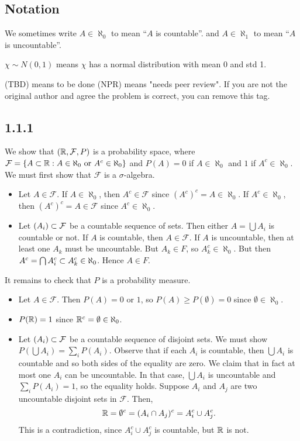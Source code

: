 \documentclass[11pt]{article}
\begin{document}
\subsection*{Notation}

We sometimes write $A \in \aleph_0$ to mean ``$A$ is countable''. and $A \in \aleph_1$ to mean ``$A$ is uncountable''. 

$\chi \sim N(0,1)$ means $\chi$ has a normal distribution with mean 0 and std 1.

(TBD) means to be done
(NPR) means "needs peer review". If you are not the original author and agree the problem is correct, you can remove this tag.

\subsection*{1.1.1}

We show that $({\mathbb R}, \mathcal{F}, P)$ is a probability space, where $\mathcal{F} = \{A \subset {\mathbb R} : A \in \aleph_0 \text{ or } A^c \in \aleph_0\}$ and $P(A) = 0$ if $A \in \aleph_0$ and $1$ if $A^c \in \aleph_0$. We must first show that $\mathcal{F}$ is a $\sigma$-algebra. 

\begin{itemize}
    \item Let $A \in \mathcal{F}$. If $A \in \aleph_0$, then $A^c \in \mathcal{F}$ since $(A^c)^c = A \in \aleph_0$. If $A^c \in \aleph_0$, then $(A^c)^c = A \in \mathcal{F}$ since $A^c \in \aleph_0$.
    \item Let $(A_i) \subset \mathcal{F}$ be a countable sequence of sets. Then either $A = \bigcup A_i$ is countable or not. If $A$ is countable, then $A \in \mathcal{F}$. If $A$ is uncountable, then at least one $A_k$ must be uncountable. But $A_k \in F$, so $A_k^c \in \aleph_0$. But then $A^c = \bigcap A_i^c \subset A_k^c \in \aleph_0$. Hence $A \in F$.
\end{itemize} 

It remains to check that $P$ is a probability measure. 

\begin{itemize}
    \item Let $A \in \mathcal{F}$. Then $P(A) = 0$ or $1$, so $P(A) \geq P(\emptyset) = 0$ since $\emptyset \in \aleph_0$.
    \item $P({\mathbb R}) = 1$ since ${\mathbb R}^c = \emptyset \in \aleph_0$.
    \item Let $(A_i) \subset \mathcal{F}$ be a countable sequence of disjoint sets. We must show $P(\bigcup A_i) = \sum_i P(A_i)$. Observe that if each $A_i$ is countable, then $\bigcup A_i$ is countable and so both sides of the equality are zero. We claim that in fact at most one $A_i$ can be uncountable. In that case, $\bigcup A_i$ is uncountable and $\sum_i P(A_i) = 1$, so the equality holds. Suppose $A_i$ and $A_j$ are two uncountable disjoint sets in $\mathcal{F}$. Then, \[{\mathbb R} = \emptyset^c = (A_i \cap A_j)^c = A_i^c \cup A_j^c.\] This is a contradiction, since $A_i^c \cup A_j^c$ is countable, but ${\mathbb R}$ is not. 
\end{itemize}
\end{document}
